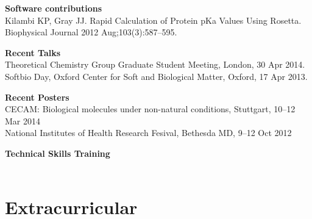 \documentclass[margin]{res}
\begin{document}
\begin{sloppypar}
\begin{resume}
\textbf{Software contributions} \\
Kilambi KP, Gray JJ. Rapid Calculation of Protein pKa Values Using Rosetta. Biophysical Journal 2012 Aug;103(3):587--595.

\textbf{Recent Talks} \\
Theoretical Chemistry Group Graduate Student Meeting, London, 30 Apr 2014. \\
Softbio Day, Oxford Center for Soft and Biological Matter, Oxford, 17 Apr 2013.

\textbf{Recent Posters} \\
CECAM: Biological molecules under non-natural conditions, Stuttgart, 10--12 Mar 2014 \\
National Institutes of Health Research Fesival, Bethesda MD, 9--12 Oct 2012 

\textbf{Technical Skills Training} \\
 \\


\section{Extracurricular}
 \\
 \\
 \\
 \\
 \\


\end{resume}
\end{sloppypar}
\end{document}
